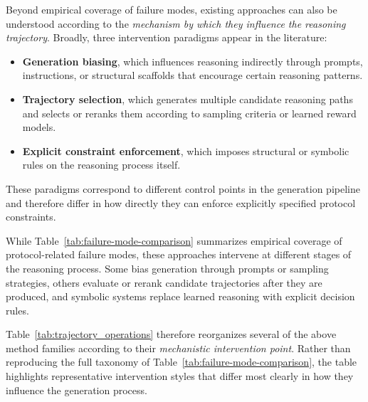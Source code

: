 \documentclass[twocolumn]{article}
\begin{document}
Beyond empirical coverage of failure modes, existing approaches can also be
understood according to the \emph{mechanism by which they influence the
reasoning trajectory}. Broadly, three intervention paradigms appear in the
literature:

\begin{itemize}[leftmargin=*]
  \item \textbf{Generation biasing}, which influences reasoning indirectly
    through prompts, instructions, or structural scaffolds that encourage
    certain reasoning patterns.

  \item \textbf{Trajectory selection}, which generates multiple candidate
    reasoning paths and selects or reranks them according to sampling criteria
    or learned reward models.

  \item \textbf{Explicit constraint enforcement}, which imposes structural or
    symbolic rules on the reasoning process itself.
\end{itemize}

These paradigms correspond to different control points in the generation
pipeline and therefore differ in how directly they can enforce explicitly
specified protocol constraints.

While Table~\ref{tab:failure-mode-comparison} summarizes empirical coverage of
protocol-related failure modes, these approaches intervene at different stages
of the reasoning process. Some bias generation through prompts or sampling
strategies, others evaluate or rerank candidate trajectories after they are
produced, and symbolic systems replace learned reasoning with explicit decision
rules.

Table~\ref{tab:trajectory_operations} therefore reorganizes several of the above
method families according to their \emph{mechanistic intervention point}. Rather
than reproducing the full taxonomy of Table~\ref{tab:failure-mode-comparison},
the table highlights representative intervention styles that differ most clearly
in how they influence the generation process.
\end{document}
